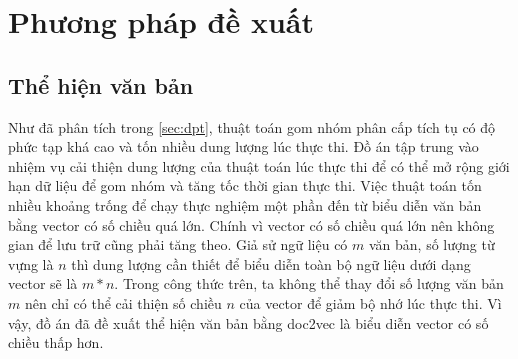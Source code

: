 \chapter{Phương pháp đề xuất}
\label{Chapter3}

%

\section{Thể hiện văn bản}
Như đã phân tích trong \ref{sec:dpt}, thuật toán gom nhóm phân cấp tích tụ có độ phức tạp khá cao và tốn nhiều dung lượng lúc thực thi.
Đồ án tập trung vào nhiệm vụ cải thiện dung lượng của thuật toán lúc thực thi để có thể mở rộng giới hạn dữ liệu để gom nhóm và tăng tốc thời gian thực thi.
Việc thuật toán tốn nhiều khoảng trống để chạy thực nghiệm một phần đến từ biểu diễn văn bản bằng vector có số chiều quá lớn.
Chính vì vector có số chiều quá lớn nên không gian để lưu trữ cũng phải tăng theo.
Giả sử ngữ liệu có $m$ văn bản, số lượng từ vựng là $n$ thì dung lượng cần thiết để biểu diễn toàn bộ ngữ liệu dưới dạng vector sẽ là $m * n$.
Trong công thức trên, ta không thể thay đổi số lượng văn bản $m$ nên chỉ có thể cải thiện số chiều $n$ của vector để giảm bộ nhớ lúc thực thi.
Vì vậy, đồ án đã đề xuất thể hiện văn bản bằng doc2vec là biểu diễn vector có số chiều thấp hơn.

